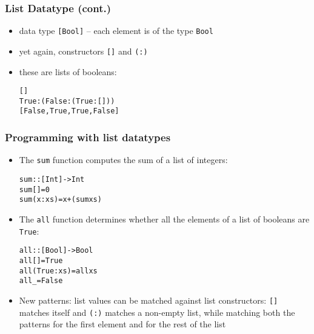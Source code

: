 \documentclass[final,handout]{beamer}
\begin{document}
\begin{frame}[fragile]
    \frametitle{List Datatype (cont.)}

    \begin{itemize}
        \item<1-> data type \texttt{[Bool]} -- each element is of the type \texttt{Bool}
        \item<2-> yet again, constructors \texttt{[]} and \texttt{(:)}
        \item<3-> these are lists of booleans:
            \begin{alltt}
        []
        True : (False : (True : []))
        [False, True, True, False]
            \end{alltt}
    \end{itemize}
\end{frame}

\begin{frame}[fragile]
    \frametitle{Programming with list datatypes}

    \begin{itemize}
        \item<1-> The \texttt{sum} function computes the sum of a list of integers:
            \begin{alltt}
    sum :: [Int] -> Int
    sum []          = 0
    sum (x : xs)    = x + (sum xs)
            \end{alltt}

        \item<3-> The \texttt{all} function determines whether all the elements of a list
            of booleans are \texttt{True}:
            \begin{alltt}
    all :: [Bool] -> Bool
    all []          = True
    all (True : xs) = all xs
    all _           = False
            \end{alltt}

        \item<2-> {\color{green} New patterns:} list values can be matched against list
            constructors: \texttt{[]} matches itself and \texttt{(:)} matches
            a non-empty list, while matching both the patterns for the first element and
            for the rest of the list

    \end{itemize}
\end{frame}
\end{document}
